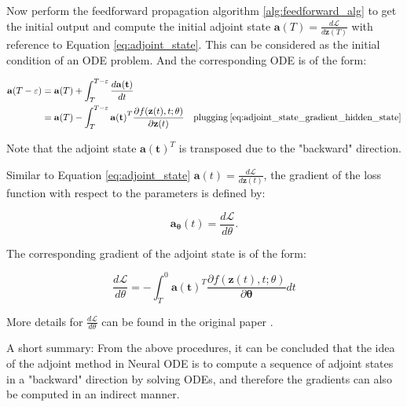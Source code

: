 \documentclass[
	parskip, 			   %
	twoside, 			   %
	DIV=14, 			   %
	BCOR=15.0mm, 		   %
	headsepline, 		   %
	open=right, 		   %
	captions=tableheading, %
	bibliography=totoc,    %
	numbers=noenddot       %
]{scrreprt}
\begin{document}
Now perform the feedforward propagation algorithm \ref{alg:feedforward_alg}  to get the initial output and compute the initial adjoint state $\mathbf{a}(T) = \frac{d\mathcal{L}}{d\mathbf{z}(T)}$ with reference to Equation \ref{eq:adjoint_state}. This can be considered as the initial condition of an ODE problem. And the corresponding ODE is of the form:

\begin{equation}
    \label{eq:adjoint_state_ODE}
    \begin{aligned}
    \mathbf{a}(T-\varepsilon) &= \mathbf{a}(T) + \int_{T}^{T-\varepsilon} \frac{d\mathbf{a(t)}}{dt} \\
    &= \mathbf{a}(T) - \int_{T}^{T-\varepsilon} \mathbf{a(t)}^T \frac{\partial f(\mathbf{z}(t), t; \theta)}{\partial \mathbf{z}(t)} \quad \text{plugging} \: \ref{eq:adjoint_state_gradient_hidden_state} \\ 
    \end{aligned}
\end{equation}

Note that the adjoint state $\mathbf{a(t)}^T$ is transposed due to the "backward" direction.

Similar to Equation \ref{eq:adjoint_state} $\mathbf{a}(t) = \frac{d\mathcal{L}}{d\mathbf{z}(t)}$, the gradient of the loss function with respect to the parameters is defined by:

\begin{equation}
    \label{eq:adjoint_state_parameters}
    \mathbf{a_\theta}(t) = \frac{d\mathcal{L}}{d\theta}.
\end{equation}

The corresponding gradient of the adjoint state is of the form:

\begin{equation}
    \label{eq:adjoint_state_gradient_parameters}
    \frac{d\mathcal{L}}{d\theta} = - \int_{T}^{0} \mathbf{a(t)}^T \frac{\partial f(\mathbf{z}(t), t; \theta)}{\partial \mathbf{\theta}} dt
\end{equation}


More details for $\frac{d\mathcal{L}}{d\theta}$ can be found in the original paper \cite{chen2018neural}.

A short summary: From the above procedures, it can be concluded that the idea of the adjoint method in Neural ODE is to compute a sequence of adjoint states in a "backward" direction by solving ODEs, and therefore the gradients can also be computed in an indirect manner.
\end{document}
